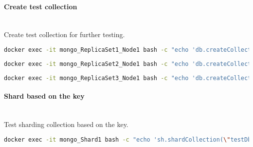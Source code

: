\paragraph{Create test collection}\mbox{}\\
Create test collection for further testing.
\begin{lstlisting}[language=Bash, caption=Create test collection RS1]
docker exec -it mongo_ReplicaSet1_Node1 bash -c "echo 'db.createCollection(\"testDb.testCollection\")' | mongosh"
\end{lstlisting}
\begin{lstlisting}[language=Bash, caption=Create test collection RS2]
docker exec -it mongo_ReplicaSet2_Node1 bash -c "echo 'db.createCollection(\"testDb.testCollection\")' | mongosh"
\end{lstlisting}
\begin{lstlisting}[language=Bash, caption=Create test collection RS3]
docker exec -it mongo_ReplicaSet3_Node1 bash -c "echo 'db.createCollection(\"testDb.testCollection\")' | mongosh"
\end{lstlisting}

\paragraph{Shard based on the key}\mbox{}\\
Test sharding collection based on the key.
\begin{lstlisting}[language=Bash, caption=Shard based on the key]
docker exec -it mongo_Shard1 bash -c "echo 'sh.shardCollection(\"testDb.testCollection\", {\"shardingField\" : 1})' | mongosh"
\end{lstlisting}